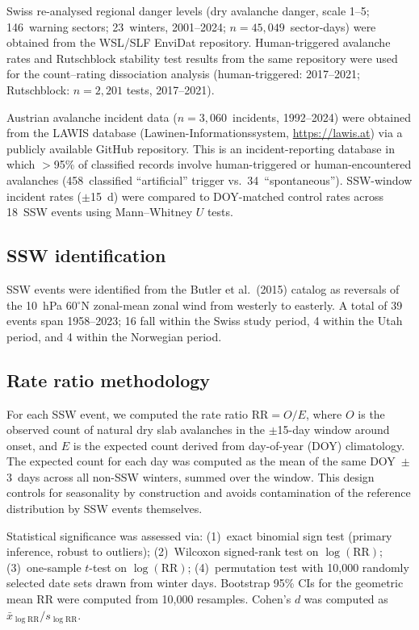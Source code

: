 \documentclass[11pt,letterpaper]{article}
\begin{document}
Swiss re-analysed regional danger levels (dry avalanche danger, scale 1--5; 146~warning sectors; 23~winters, 2001--2024; $n = 45{,}049$~sector-days) were obtained from the WSL/SLF EnviDat repository. Human-triggered avalanche rates and Rutschblock stability test results from the same repository were used for the count--rating dissociation analysis (human-triggered: 2017--2021; Rutschblock: $n = 2{,}201$ tests, 2017--2021).

Austrian avalanche incident data ($n = 3{,}060$~incidents, 1992--2024) were obtained from the LAWIS database (Lawinen-Informationssystem, \url{https://lawis.at}) via a publicly available GitHub repository. This is an incident-reporting database in which $>$95\% of classified records involve human-triggered or human-encountered avalanches (458~classified ``artificial'' trigger vs.\ 34~``spontaneous''). SSW-window incident rates ($\pm$15~d) were compared to DOY-matched control rates across 18~SSW events using Mann--Whitney $U$ tests.

\subsection*{SSW identification}

SSW events were identified from the Butler et al.\ (2015) catalog\cite{Butler2015} as reversals of the 10~hPa 60$^\circ$N zonal-mean zonal wind from westerly to easterly. A total of 39 events span 1958--2023; 16 fall within the Swiss study period, 4 within the Utah period, and 4 within the Norwegian period.

\subsection*{Rate ratio methodology}

For each SSW event, we computed the rate ratio $\mathrm{RR} = O / E$, where $O$ is the observed count of natural dry slab avalanches in the $\pm$15-day window around onset, and $E$ is the expected count derived from day-of-year (DOY) climatology. The expected count for each day was computed as the mean of the same DOY~$\pm$3~days across all non-SSW winters, summed over the window. This design controls for seasonality by construction and avoids contamination of the reference distribution by SSW events themselves.

Statistical significance was assessed via: (1)~exact binomial sign test (primary inference, robust to outliers\cite{Wilcox2017}); (2)~Wilcoxon signed-rank test on $\log(\mathrm{RR})$; (3)~one-sample $t$-test on $\log(\mathrm{RR})$; (4)~permutation test with 10,000 randomly selected date sets drawn from winter days. Bootstrap 95\% CIs for the geometric mean RR were computed from 10,000 resamples. Cohen's $d$ was computed as $\bar{x}_{\log\mathrm{RR}} / s_{\log\mathrm{RR}}$.
\end{document}
